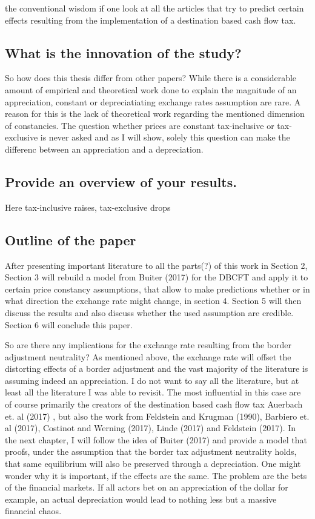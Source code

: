 the conventional wisdom if one look at all the articles that try to predict certain effects resulting from the implementation of a destination based cash flow tax.


\subsection{What is the innovation of the study?}
So how does this thesis differ from other papers? While there is a considerable amount of empirical and theoretical work done to explain the magnitude of an appreciation, constant or depreciatiating exchange rates assumption are rare. A reason for this is the lack of theoretical work regarding the mentioned dimension of constancies. The question whether prices are constant tax-inclusive or tax-exclusive is never asked and as I will show, solely this question can make the differenc between an appreciation and a depreciation.

\subsection{Provide an overview of your results.}
Here tax-inclusive raises, tax-exclusive drops 

\subsection{Outline of the paper}
After presenting important literature to all the parts(?) of this work in Section 2, Section 3 will rebuild a model from Buiter (2017) for the DBCFT and apply it to certain price constancy assumptions, that allow to make predictions whether or in what direction the exchange rate might change, in section 4. Section 5 will then discuss the results and also discuss whether the used assumption are credible. Section 6 will conclude this paper.  


So are there any implications for the exchange rate resulting from the border adjustment neutrality? 
As mentioned above, the exchange rate will offset the distorting effects of a border adjustment and the vast majority of the literature is assuming indeed an appreciation. I do not want to say all the literature, but at least all the literature I was able to revisit. The most influential in this case are of course primarily the creators of the destination based cash flow tax Auerbach et. al (2017) , but also the work from Feldstein and Krugman (1990), Barbiero et. al (2017), Costinot and Werning (2017), Linde (2017) and Feldstein (2017).
In the next chapter, I will follow the idea of Buiter (2017) and provide a model that proofs, under the assumption that the border tax adjustment neutrality holds, that same equilibrium will also be preserved through a depreciation. One might wonder why it is important, if the effects are the same. The problem are the bets of the financial markets. If all actors bet on an appreciation of the dollar for example, an actual depreciation would lead to nothing less but a massive financial chaos.
